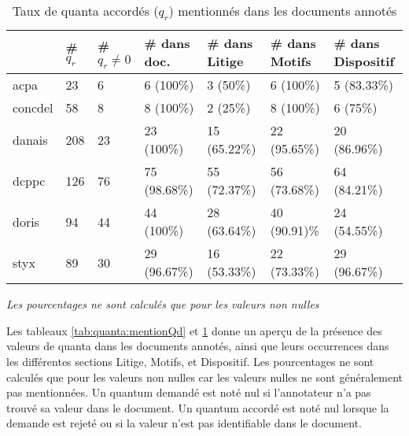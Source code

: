 \begin{table}[!htb]
	\scriptsize
	\begin{tabular}{|l|l|l|l|l|l|l|}
		\hline
		& \textbf{\# $q_r$} & \textbf{\# $q_r\neq 0$} & \textbf{\# dans doc.} & \textbf{\# dans Litige} & \textbf{\# dans Motifs} & \textbf{\# dans Dispositif} \\ \hline
		acpa               & 23                & 6                       & 6 (100\%)             & 3 (50\%)                & 6 (100\%)               & 5 (83.33\%)                 \\ \hline
		concdel            & 58                & 8                       & 8 (100\%)             & 2 (25\%)                & 8 (100\%)               & 6 (75\%)                    \\ \hline
		danais             & 208               & 23                      & 23 (100\%)            & 15 (65.22\%)            & 22 (95.65\%)            & 20 (86.96\%)                \\ \hline
		dcppc              & 126               & 76                      & 75 (98.68\%)          & 55 (72.37\%)            & 56 (73.68\%)            & 64 (84.21\%)                \\ \hline
		doris              & 94                & 44                      & 44 (100\%)            & 28 (63.64\%)            & 40 (90.91)\%            & 24 (54.55\%)                \\ \hline
		styx               & 89                & 30                      & 29 (96.67\%)          & 16 (53.33\%)            & 22 (73.33\%)            & 29 (96.67\%)                \\ \hline
	\end{tabular}
\textit{Les pourcentages ne sont calculés que pour les valeurs non nulles}
\caption{Taux de quanta accordés ($q_r$) mentionnés dans les documents annotés} \label{tab:quanta:mentionQr}
\end{table}

Les tableaux \ref{tab:quanta:mentionQd} et \ref{tab:quanta:mentionQr} donne un aperçu de la présence des valeurs de quanta dans les documents annotés, ainsi que leurs occurrences dans les différentes sections Litige, Motifs, et Dispositif. Les pourcentages ne sont calculés que pour les valeurs non nulles car les valeurs nulles ne sont généralement pas mentionnées. Un quantum demandé est noté nul si l'annotateur n'a pas trouvé sa valeur dans le document. Un quantum accordé est noté nul lorsque la demande est rejeté ou si la valeur n'est pas identifiable dans le document.

